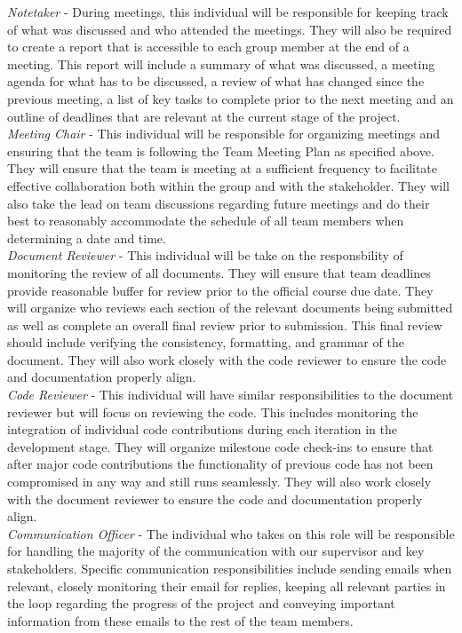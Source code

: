 \documentclass{article}
\begin{document}
\textit{Notetaker} - During meetings, this individual will be responsible for keeping track of what was discussed
and who attended the meetings. They will also be required to create a report that is accessible to each group member
at the end of a meeting. This report will include a summary of what was discussed, a meeting agenda for what has to
be discussed, a review of what has changed since the previous meeting, a list of key tasks to complete prior to the
next meeting and an outline of deadlines that are relevant at the current stage of the project.\\

\textit{Meeting Chair} - This individual will be responsible for organizing meetings and ensuring that the team is
following the Team Meeting Plan as specified above. They will ensure that the team is meeting at a sufficient
frequency to facilitate effective collaboration both within the group and with the stakeholder. They will also take
the lead on team discussions regarding future meetings and do their best to reasonably accommodate the schedule of
all team members when determining a date and time.\\

\textit{Document Reviewer} - This individual will be take on the responsbility of monitoring the review of all
documents. They will ensure that team deadlines provide reasonable buffer for review prior to the official course
due date. They will organize who reviews each section of the relevant documents being submitted as well as complete
an overall final review prior to submission. This final review should include verifying the consistency,
formatting, and grammar of the document. They will also work closely with the code reviewer to ensure the code and
documentation properly align.\\

\textit{Code Reviewer} - This individual will have similar responsibilities to the document reviewer but will focus
on reviewing the code. This includes monitoring the integration of individual code contributions during each
iteration in the development stage. They will organize milestone code check-ins to ensure that after major code
contributions the functionality of previous code has not been compromised in any way and still runs seamlessly. They
will also work closely with the document reviewer to ensure the code and documentation properly align.\\

\textit{Communication Officer} - The individual who takes on this role will be responsible for handling the majority
of the communication with our supervisor and key stakeholders. Specific communication responsibilities include
sending emails when relevant, closely monitoring their email for replies, keeping all relevant parties in the loop
regarding the progress of the project and conveying important information from these emails to the rest of the team
members.
\end{document}
